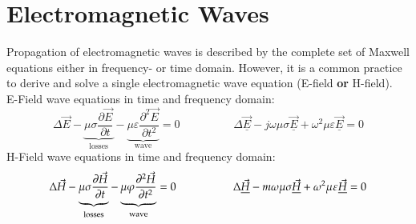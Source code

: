 \section{Electromagnetic Waves}
Propagation of electromagnetic waves is described by the complete set of Maxwell equations either in frequency- or time domain. However, it is a common practice to derive and solve a single electromagnetic wave equation (E-field \textbf{or} H-field).\\

E-Field wave equations in time and frequency domain:
\begin{equation*}
	\Delta \vec{E} - \underbrace{\mu\sigma\frac{\partial \vec{E}}{\partial t}}_{\textrm{losses}} - \underbrace{\mu\varepsilon\frac{\partial^2 \vec{E}}{\partial t^2}}_{\textrm{wave}} = 0
	\hspace{2cm}
	\Delta \underline{\vec{E}} - j\omega\mu\sigma\underline{\vec{E}} + \omega^2\mu\varepsilon\underline{\vec{E}} = 0
\end{equation*}
H-Field wave equations in time and frequency domain:
\begin{equation*}
	\Delta\vec{H} - \underbrace{\mu\sigma\frac{\partial \vec{H}}{\partial t}}_{\textrm{losses}} - \underbrace{\mu\varphi\frac{\partial^2 \vec{H}}{\partial t^2}}_{\textrm{wave}} = 0
	\hspace{1.8cm}
	\Delta \underline{\vec{H}} - m\omega\mu\sigma\underline{\vec{H}} + \omega^2\mu\varepsilon\underline{\vec{H}} = 0
\end{equation*}


